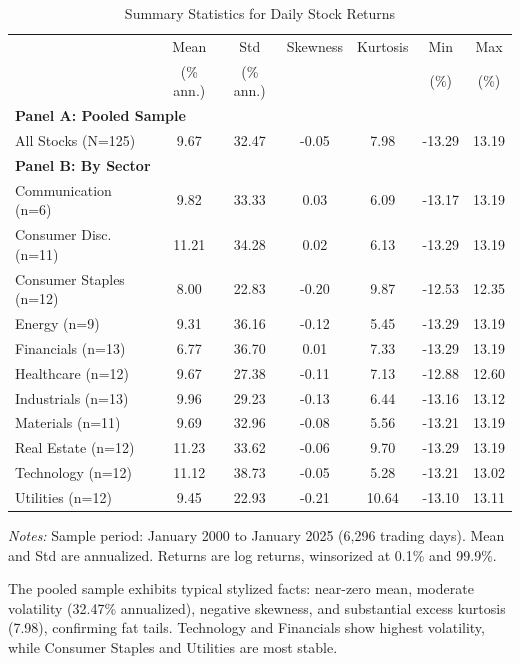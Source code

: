 \documentclass[12pt,a4paper]{article}
\begin{document}
\begin{table}[H]
\centering
\caption{Summary Statistics for Daily Stock Returns}
\label{tab:summary_stats}
\small
\begin{tabular}{lcccccc}
\toprule
 & Mean & Std & Skewness & Kurtosis & Min & Max \\
 & (\% ann.) & (\% ann.) & & & (\%) & (\%) \\
\midrule
\multicolumn{7}{l}{\textbf{Panel A: Pooled Sample}} \\
All Stocks (N=125) & 9.67 & 32.47 & -0.05 & 7.98 & -13.29 & 13.19 \\
\midrule
\multicolumn{7}{l}{\textbf{Panel B: By Sector}} \\
Communication (n=6) & 9.82 & 33.33 & 0.03 & 6.09 & -13.17 & 13.19 \\
Consumer Disc. (n=11) & 11.21 & 34.28 & 0.02 & 6.13 & -13.29 & 13.19 \\
Consumer Staples (n=12) & 8.00 & 22.83 & -0.20 & 9.87 & -12.53 & 12.35 \\
Energy (n=9) & 9.31 & 36.16 & -0.12 & 5.45 & -13.29 & 13.19 \\
Financials (n=13) & 6.77 & 36.70 & 0.01 & 7.33 & -13.29 & 13.19 \\
Healthcare (n=12) & 9.67 & 27.38 & -0.11 & 7.13 & -12.88 & 12.60 \\
Industrials (n=13) & 9.96 & 29.23 & -0.13 & 6.44 & -13.16 & 13.12 \\
Materials (n=11) & 9.69 & 32.96 & -0.08 & 5.56 & -13.21 & 13.19 \\
Real Estate (n=12) & 11.23 & 33.62 & -0.06 & 9.70 & -13.29 & 13.19 \\
Technology (n=12) & 11.12 & 38.73 & -0.05 & 5.28 & -13.21 & 13.02 \\
Utilities (n=12) & 9.45 & 22.93 & -0.21 & 10.64 & -13.10 & 13.11 \\
\bottomrule
\end{tabular}
\begin{tablenotes}\small
\item \textit{Notes:} Sample period: January 2000 to January 2025 (6,296 trading days). Mean and Std are annualized. Returns are log returns, winsorized at 0.1\% and 99.9\%.
\end{tablenotes}
\end{table}
\noindent
The pooled sample exhibits typical stylized facts: near-zero mean, moderate volatility (32.47\% annualized), negative skewness, and substantial excess kurtosis (7.98), confirming fat tails. Technology and Financials show highest volatility, while Consumer Staples and Utilities are most stable.
\end{document}
